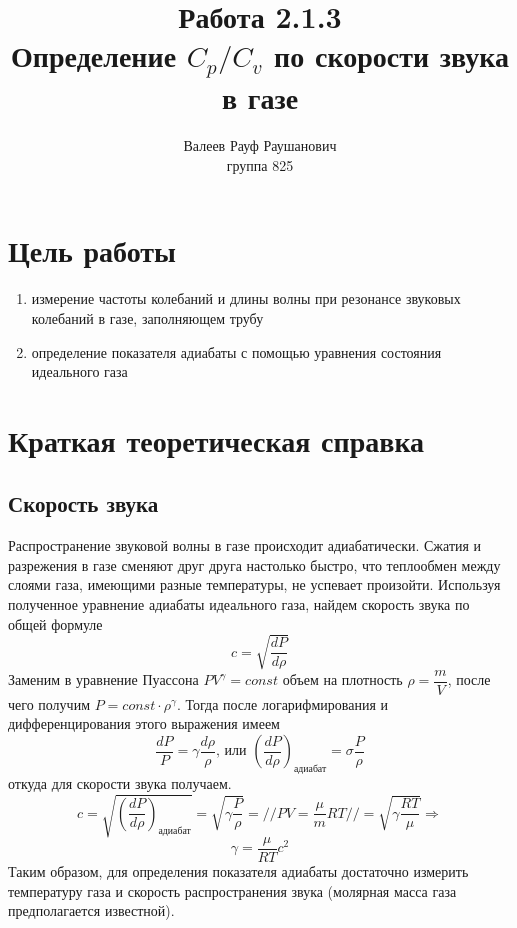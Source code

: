 \documentclass[a4paper, 12pt]{article}%
\author{Валеев Рауф Раушанович \\
группа 825}
\title{\textbf{Работа 2.1.3 \\ 
Определение $C_p / C_v$ по скорости звука в газе}}
\begin{document}
\maketitle
\newpage
\section*{Цель работы}
\begin{enumerate}
\item измерение частоты колебаний и длины волны при резонансе звуковых колебаний в газе, заполняющем трубу
\item определение показателя адиабаты с помощью уравнения состояния идеального газа
\end{enumerate}
\section*{Краткая теоретическая справка}
\subsection*{Скорость звука}
Распространение звуковой волны в газе происходит адиабатически. Сжатия и разрежения в газе сменяют друг друга настолько быстро, что теплообмен между слоями газа, имеющими разные температуры, не успевает произойти. Используя полученное уравнение адиабаты идеального газа, найдем скорость звука по общей формуле
\[c = \sqrt{\dfrac{dP}{d \rho}}\]
Заменим в уравнение Пуассона $PV^{\gamma} = const$ объем на плотность $\rho = \dfrac{m}{V}$, после чего получим $P = const \cdot \rho^{\gamma}$. Тогда после логарифмирования и дифференцирования этого выражения имеем 
\[ \dfrac{dP}{P} = \gamma \dfrac{d \rho }{\rho} \text{, или } \left( \dfrac{dP}{d\rho} \right)_\text{адиабат} = \sigma \dfrac{P}{\rho} \]
откуда для скорости звука получаем.
\[ c = \sqrt{\left( \dfrac{dP}{d\rho} \right)_\text{адиабат}} = \sqrt{\gamma \dfrac{P}{\rho}} = // PV = \dfrac{\mu}{m} RT // = \sqrt{\gamma \dfrac{RT}{\mu}} \Rightarrow \]
\[ \gamma = \dfrac{\mu}{RT} c^2\]
Таким образом, для определения показателя адиабаты достаточно измерить температуру газа и скорость распространения звука (молярная масса газа предполагается известной).
\end{document}
